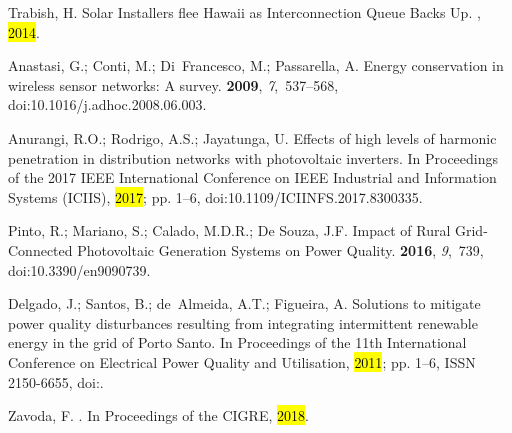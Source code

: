 \documentclass[energies,article,accept,moreauthors,pdftex]{Definitions/mdpi}
\begin{document}
\begin{thebibliography}{999}
\providecommand{\natexlab}[1]{#1}

Trabish, H.
\newblock Solar Installers flee {Hawaii} as Interconnection Queue Backs Up.
, {\hl{2014}}.%

Anastasi, G.; Conti, M.; Di~Francesco, M.; Passarella, A.
\newblock Energy conservation in wireless sensor networks: {A} survey.
 {\bf 2009}, {\em 7},~537--568, doi:10.1016/j.adhoc.2008.06.003.

Anurangi, R.O.; Rodrigo, A.S.; Jayatunga, U.
\newblock Effects of high levels of harmonic penetration in distribution
networks with photovoltaic inverters.
\newblock In {Proceedings of the } 2017 {IEEE} {International} {Conference} on IEEE Industrial and {Information} {Systems} ({ICIIS}),  \hl{2017}; pp. 1--6, doi:10.1109/ICIINFS.2017.8300335.%

Pinto, R.; Mariano, S.; Calado, M.D.R.;  De Souza, J.F. 
\newblock Impact of {Rural} {Grid}-{Connected} {Photovoltaic} {Generation}
{Systems} on {Power} {Quality}.
 {\bf 2016}, {\em 9},~739, doi:10.3390/en9090739.

Delgado, J.; Santos, B.; de~Almeida, A.T.; Figueira, A.
\newblock Solutions to mitigate power quality disturbances resulting from
integrating intermittent renewable energy in the grid of {Porto} {Santo}.
\newblock In {Proceedings of the } 11th {International} {Conference} on {Electrical} {Power} {Quality}
and {Utilisation}, \hl{2011}; pp. 1--6, 
\newblock ISSN 2150-6655,
doi:{\href{https://doi.org/10.1109/EPQU.2011.6128870}{}}.

Zavoda, F.
. In {Proceedings of the } CIGRE, \hl{2018}.


\end{thebibliography}
\end{document}
